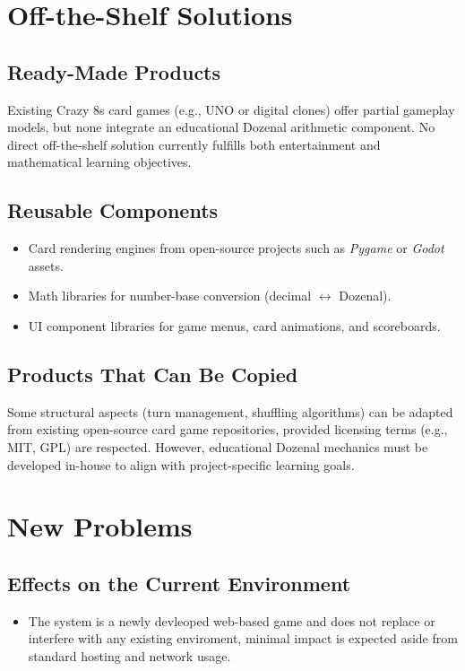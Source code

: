 \documentclass[12pt]{article}
\begin{document}
\section{Off-the-Shelf Solutions}

\subsection{Ready-Made Products}
Existing Crazy 8s card games (e.g., UNO or digital clones) offer partial gameplay models, but none integrate an educational Dozenal arithmetic component.
No direct off-the-shelf solution currently fulfills both entertainment and mathematical learning objectives.

\subsection{Reusable Components}
\begin{itemize}
    \item Card rendering engines from open-source projects such as \textit{Pygame} or \textit{Godot} assets.
    \item Math libraries for number-base conversion (decimal $\leftrightarrow$ Dozenal).
    \item UI component libraries for game menus, card animations, and scoreboards.
\end{itemize}

\subsection{Products That Can Be Copied}
Some structural aspects (turn management, shuffling algorithms) can be adapted from existing open-source card game repositories, provided licensing terms (e.g., MIT, GPL) are respected.
However, educational Dozenal mechanics must be developed in-house to align with project-specific learning goals.


\section{New Problems}
\subsection{Effects on the Current Environment}
\begin{itemize}
	\item The system is a newly devleoped web-based game and does not replace or interfere with any existing enviroment, minimal impact is expected aside from standard hosting and network usage.
\end{itemize}
\end{document}
